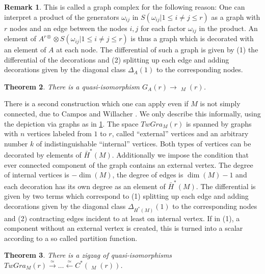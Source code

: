 \documentclass{scrartcl}
\theoremstyle{plain}
\newtheorem{theorem}{Theorem}[section]
\theoremstyle{definition}
\newtheorem{remark}[theorem]{Remark}
\newcommand{\quiso}{\simeq}
\let\xto\xrightarrow
\let\xfrom\xleftarrow
\DeclareMathOperator{\cConf}{\overline{Conf}}
\begin{document}
\begin{remark}\label{rmk:graph-complex}
    This is called a graph complex for the following reason: One can interpret a product of the generators $\omega_{ij}$ in $S(\omega_{ij} | {1 \leq i\neq j\leq r})$ as a graph with $r$ nodes and an edge between the nodes $i, j$ for each factor $\omega_{ij}$ in the product. An element of $A^{r\otimes} \otimes S(\omega_{ij} | {1 \leq i\neq j\leq r})$ is thus a graph which is decorated with an element of $A$ at each node. The differential of such a graph is given by (1) the differential of the decorations and (2) splitting up each edge and adding decorations given by the diagonal class $\Delta_A(1)$ to the corresponding nodes. 
\end{remark}

\begin{theorem}
    There is a quasi-isomorphism $G_A(r)\to \cConf_M(r)$.
\end{theorem}

There is a second construction which one can apply even if $M$ is not simply connected, due to Campos and Willacher \cite{campos2016model}. We only describe this informally, using the depiction via graphs as in \cref{rmk:graph-complex}. The space $TwGra_M(r)$ is spanned by graphs with $n$ vertices labeled from $1$ to $r$, called ``external'' vertices and an arbitrary number $k$ of indistinguishable ``internal'' vertices. Both types of vertices can be decorated by elements of $\bar H^*(M)$. Additionally we impose the condition that ever connected component of the graph contains an external vertex. The degree of internal vertices is $-\dim(M)$, the degree of edges is $\dim(M)-1$ and each decoration has its own degree as an element of $\bar H^*(M)$. The differential is given by two terms which correspond to (1) splitting up each edge and adding decorations given by the diagonal class $\Delta_{H^*(M)}(1)$ to the corresponding nodes and (2) contracting edges incident to at least on internal vertex. If in (1), a component without an external vertex is created, this is turned into a scalar according to a so called partition function. 

\begin{theorem}
    There is a zigzag of quasi-isomorphisms $TwGra_M(r)\xto{\quiso}\dots\xfrom{\quiso} C^*(\cConf_M(r))$.
\end{theorem}
\end{document}
